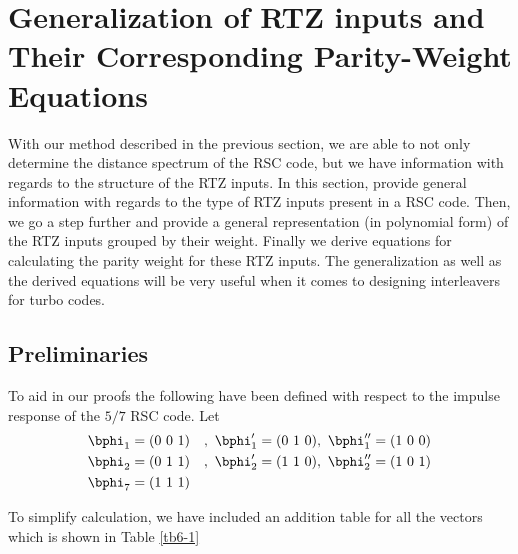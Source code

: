 \section{Generalization of RTZ inputs and Their Corresponding Parity-Weight Equations}
With our method described in the previous section, we are able to not only determine the distance spectrum of the RSC code, but we have information with regards to the structure of the RTZ inputs. In this section, provide general information with regards to the type of RTZ inputs present in a RSC code. Then, we go a step further and provide a general representation (in polynomial form) of the RTZ inputs grouped by their weight. Finally we derive equations for calculating the parity weight for these RTZ inputs. The generalization as well as the derived equations will be very useful when it comes to designing interleavers for turbo codes.

\subsection{Preliminaries}
To aid in our proofs the following have been defined with respect to the impulse response of the $5/7$ RSC code.
Let 
\begin{eqnarray}
&\bphi_1=(0~0~1)&,~\bphi'_1=(0~1~0),~\bphi''_1=(1~0~0)\\
&\bphi_2=(0~1~1)&,~\bphi'_2=(1~1~0),~\bphi''_2=(1~0~1)\\
&\bphi_7=(1~1~1)&
\end{eqnarray}

To simplify calculation, we have included an addition table for all the vectors which is shown in Table \ref{tb6-1}

\begin{table}[h!]
\centering
{}
\caption{Truth Table}
\label{tb6-1}
\end{table}

